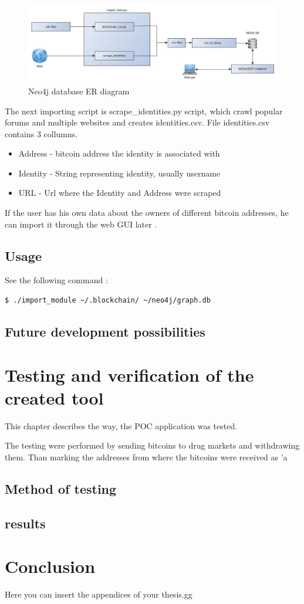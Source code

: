 \documentclass[
  digital, %
  table,   %
  lof,     %
  lot,     %
  oneside
]{fithesis3}
\begin{document}
\begin{figure}[!htb]
    \centering
    \includegraphics[width=1\textwidth]{application_architecture}
    \caption{Neo4j database ER diagram}
    \label{application_architecture}
\end{figure}

The next importing script is scrape\_identities.py script, which crawl popular forums and multiple websites and creates 
identities.csv.
File identities.csv contains 3 collumns.
\begin{itemize}
  \item Address - bitcoin address the identity is associated with
  \item Identity - String representing identity, usually username
  \item URL - Url where the Identity and Address were scraped
\end{itemize}

If the user has his own data about the owners of different bitcoin addresses, he can import it through the web GUI later
.


\section{Usage}

\noindent See the following command :
\begin{lstlisting}[language=bash]
  $ ./import_module ~/.blockchain/ ~/neo4j/graph.db
\end{lstlisting}

\section{Future development possibilities}


\chapter{Testing and verification of the created tool}
This chapter describes the way, the POC application was tested.

The testing were performed by sending bitcoins to drug markets and withdrawing them.
Than marking the addresses from where the bitcoins were received as 'a
\section{Method of testing}
\section{results}



\chapter{Conclusion}

Here you can insert the appendices of your thesis.gg

\printbibliography
\end{document}
